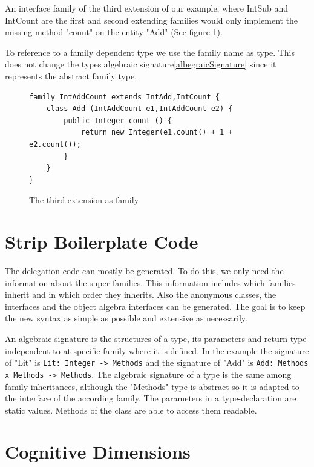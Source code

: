 \documentclass{report}
\begin{document}
An interface family of the third extension of our example, where IntSub and IntCount are the first and second extending families would only implement the missing method "count" on the entity "Add" (See figure \ref{thirdExtensionFamily}).

\label{familyDependendType}
To reference to a family dependent type we use the family name as type. This does not change the types algebraic signature\ref{albegraicSignature} since it represents the abstract family type.

\begin{figure}[h]
\begin{lstlisting}[language=exprExt]
family IntAddCount extends IntAdd,IntCount {
    class Add (IntAddCount e1,IntAddCount e2) {
        public Integer count () {
            return new Integer(e1.count() + 1 + e2.count());
        }
    }
}
\end{lstlisting}
\label{thirdExtensionFamily}
\caption{The third extension as family}
\end{figure}

\section{Strip Boilerplate Code}

The delegation code can mostly be generated. To do this, we only need the information about the super-families. This information includes which families inherit and in which order they inherits. Also the anonymous classes, the interfaces and the object algebra interfaces can be generated. The goal is to keep the new syntax as simple as possible and extensive as necessarily.

\label{albegraicSignature}
An algebraic signature\cite{Oliv-Extensibility-2012} is the structures of a type, its parameters and return type independent to at specific family where it is defined. In the example the signature of "Lit" is \lstinline{Lit: Integer -> Methods} and the signature of "Add" is \lstinline{Add: Methods x Methods -> Methods}. The algebraic signature of a type is the same among family inheritances, although the "Methods"-type is abstract so it is adapted to the interface of the according family. The parameters in a type-declaration are static values. Methods of the class are able to access them readable.

\section{Cognitive Dimensions}
\end{document}
